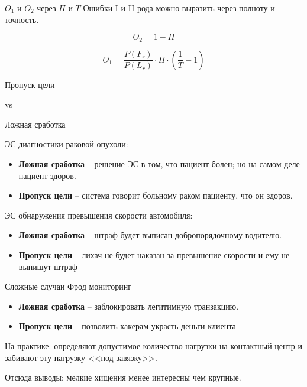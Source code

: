   \begin{frame}{$O_1$ и $O_2$ через $\Pi$ и $T$}
  Ошибки I и II рода можно выразить через полноту и точность.
  
  \begin{equation}\label{eq:O_2_from_recall}
  O_2 = 1 - \Pi
  \end{equation}
  
  \begin{equation}\label{eq:O_1_from_recall_and_presicion}
  O_1 = \frac{P(F_r)}{P(L_r)} \cdot \Pi \cdot \left( \frac{1}{T} - 1 \right)
  \end{equation}
  
  
  \end{frame}
  
  \begin{frame}
  \LARGE
  \centering
  Пропуск цели
  
  vs
  
  Ложная сработка
  
  \end{frame}

  \begin{frame}
  ЭС диагностики раковой опухоли:
  \begin{itemize}
    \item \textbf{Ложная сработка} -- 
    решение ЭС в том, что пациент болен; но на самом деле пациент здоров.
    \item \textbf{Пропуск цели}
    -- система говорит больному раком пациенту, что он здоров.
  \end{itemize}
  
  ЭС обнаружения превышения скорости автомобиля:
  \begin{itemize}
    \item \textbf{Ложная сработка}
    -- штраф будет выписан добропорядочному водителю.
    \item \textbf{Пропуск цели}
    -- лихач не будет наказан за превышение скорости и ему не выпишут штраф
  \end{itemize}
  \end{frame}
  
  \begin{frame}{Сложные случаи}
  Фрод мониторинг
  \begin{itemize}
  	\item \textbf{Ложная сработка}
  	-- заблокировать легитимную транзакцию.
  	\item \textbf{Пропуск цели}
  	-- позволить хакерам украсть деньги клиента
  \end{itemize}
  
  На практике: определяют допустимое количество нагрузки на контактный центр и 
  забивают эту нагрузку <<под завязку>>.
  
  Отсюда выводы: мелкие хищения менее интересны чем крупные.
  \end{frame}

